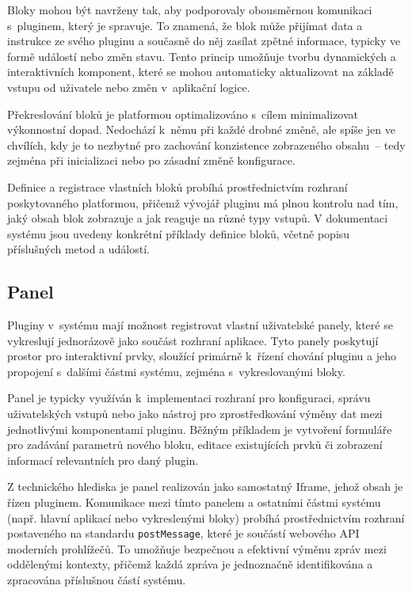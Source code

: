 Bloky mohou být navrženy tak, aby podporovaly obousměrnou komunikaci s~pluginem, který je spravuje. 
To znamená, že blok může přijímat data a instrukce ze svého pluginu a současně do něj zasílat zpětné informace, typicky ve formě událostí nebo změn stavu. 
Tento princip umožňuje tvorbu dynamických a interaktivních komponent, které se mohou automaticky aktualizovat na základě vstupu od uživatele nebo změn v~aplikační logice.

Překreslování bloků je platformou optimalizováno s~cílem minimalizovat výkonnostní dopad. 
Nedochází k~němu při každé drobné změně, ale spíše jen ve chvílích, kdy je to nezbytné pro zachování konzistence zobrazeného obsahu~-- tedy zejména při inicializaci nebo po zásadní změně konfigurace.

Definice a registrace vlastních bloků probíhá prostřednictvím rozhraní poskytovaného platformou, přičemž vývojář pluginu má plnou kontrolu nad tím, jaký obsah blok zobrazuje a jak reaguje na různé typy vstupů. 
V dokumentaci systému jsou uvedeny konkrétní příklady definice bloků, včetně popisu příslušných metod a událostí.


\subsection{Panel}

Pluginy v~systému mají možnost registrovat vlastní uživatelské panely, které se vykreslují jednorázově jako součást rozhraní aplikace. 
Tyto panely poskytují prostor pro interaktivní prvky, sloužící primárně k~řízení chování pluginu a jeho propojení s~dalšími částmi systému, zejména s~vykreslovanými bloky.

Panel je typicky využíván k~implementaci rozhraní pro konfiguraci, správu uživatelských vstupů nebo jako nástroj pro zprostředkování výměny dat mezi jednotlivými komponentami pluginu. 
Běžným příkladem je vytvoření formuláře pro zadávání parametrů nového bloku, editace existujících prvků či zobrazení informací relevantních pro daný plugin.

Z technického hlediska je panel realizován jako samostatný Iframe, jehož obsah je řízen pluginem. 
Komunikace mezi tímto panelem a ostatními částmi systému (např. hlavní aplikací nebo vykreslenými bloky) probíhá prostřednictvím rozhraní postaveného na standardu \texttt{postMessage}, které je součástí webového API moderních prohlížečů. 
To umožňuje bezpečnou a efektivní výměnu zpráv mezi oddělenými kontexty, přičemž každá zpráva je jednoznačně identifikována a zpracována příslušnou částí systému.

